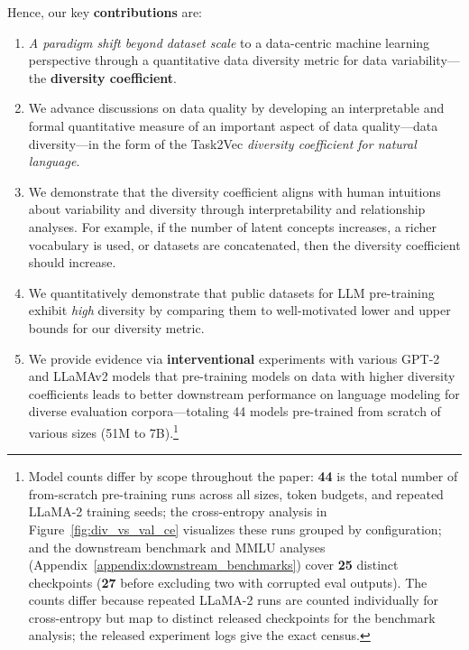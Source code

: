 Hence, our key \textbf{contributions} are:
\begin{enumerate}
    \item \textit{A paradigm shift beyond dataset scale} to a data-centric machine learning perspective through a quantitative data diversity metric for data variability---the \textbf{diversity coefficient}.
    \item We advance discussions on data quality by developing an interpretable and formal quantitative measure of an important aspect of data quality---data diversity---in the form of the Task2Vec \textit{diversity coefficient for natural language}.
    \item We demonstrate that the diversity coefficient aligns with human intuitions about variability and diversity through interpretability and relationship analyses.
    For example, if 
    the number of latent concepts increases, a richer vocabulary is used, or datasets are concatenated, then the diversity coefficient should increase.
    \item We quantitatively demonstrate that public datasets for LLM pre-training exhibit \textit{high} diversity by comparing them to well-motivated lower and upper bounds for our diversity metric.
    \item We provide evidence via \textbf{interventional} experiments with various GPT-2 and LLaMAv2 models that pre-training models on data with higher diversity coefficients leads to better downstream performance on language modeling for diverse evaluation corpora---totaling 44 models pre-trained from scratch of various sizes (51M to 7B).\footnote{Model counts differ by scope throughout the paper: \textbf{44} is the total number of from-scratch pre-training runs across all sizes, token budgets, and repeated LLaMA-2 training seeds; the cross-entropy analysis in Figure~\ref{fig:div_vs_val_ce} visualizes these runs grouped by configuration; and the downstream benchmark and MMLU analyses (Appendix~\ref{appendix:downstream_benchmarks}) cover \textbf{25} distinct checkpoints (\textbf{27} before excluding two with corrupted eval outputs). The counts differ because repeated LLaMA-2 runs are counted individually for cross-entropy but map to distinct released checkpoints for the benchmark analysis; the released experiment logs give the exact census.}

\end{enumerate}

